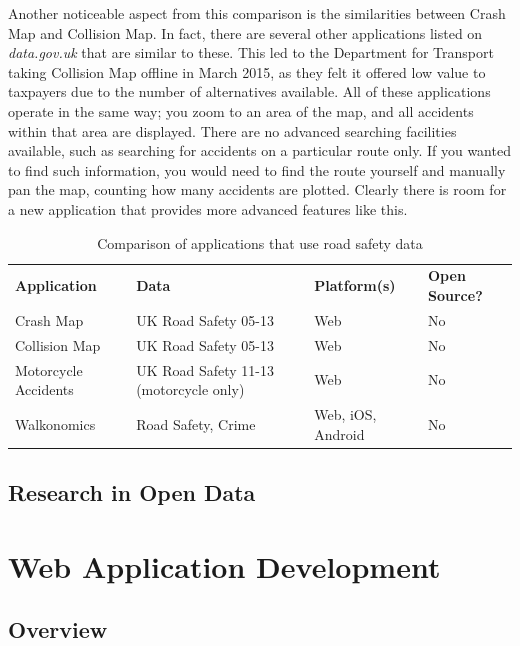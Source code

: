 \documentclass[authoryearcitations]{UoYCSproject}
\begin{document}
Another noticeable aspect from this comparison is the similarities between Crash Map and Collision Map. In fact, there are several other applications listed on \textit{data.gov.uk} that are similar to these. This led to the Department for Transport taking Collision Map offline in March 2015, as they felt it offered low value to taxpayers due to the number of alternatives available.  All of these applications operate in the same way; you zoom to an area of the map, and all accidents within that area are displayed. There are no advanced searching facilities available, such as searching for accidents on a particular route only. If you wanted to find such information, you would need to find the route yourself and manually pan the map, counting how many accidents are plotted. Clearly there is room for a new application that provides more advanced features like this.  


\begin{table}[tbp]
  \centering
  \begin{tabular}{ p{2.5cm}  p{3.2cm}  p{2.2cm}  p{2.2cm} }
      \textbf{Application} & \textbf{Data} & \textbf{Platform(s)} & \textbf{Open Source?} 
    \\Crash Map & UK Road Safety 05-13 & Web & No
	\\Collision Map & UK Road Safety 05-13 & Web & No
	\\Motorcycle Accidents & UK Road Safety 11-13 (motorcycle only) & Web & No
	\\Walkonomics & Road Safety, Crime & Web, iOS, Android & No
  \end{tabular}
  \caption{Comparison of applications that use road safety data}
  \label{tab:applications}
\end{table}

\subsection{Research in Open Data}

\section{Web Application Development}

\subsection{Overview}
\end{document}
